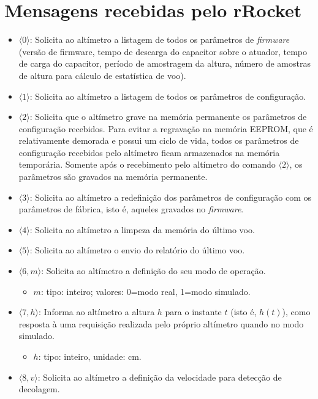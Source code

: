 \documentclass[portuguese,10pt,a4paper]{article}
\begin{document}
\section{Mensagens recebidas pelo rRocket}
\begin{itemize}
	\item $\langle 0\rangle$:
	Solicita ao altímetro a listagem de todos os parâmetros de \textit{firmware} (versão de firmware, tempo de descarga do capacitor sobre o atuador, tempo de carga do capacitor, período de amostragem da altura, número de amostras de altura para cálculo de estatística de voo).
	\item $\langle 1\rangle$:
	Solicita ao altímetro a listagem de todos os parâmetros de configuração.
	\item $\langle 2\rangle$:
	Solicita que o altímetro grave na memória permanente os parâmetros de configuração recebidos. Para evitar a regravação na memória EEPROM, que é relativamente demorada e possui um ciclo de vida, todos os parâmetros de configuração recebidos pelo altímetro ficam armazenados na memória temporária. Somente após o recebimento pelo altímetro do comando $\langle 2\rangle$, os parâmetros são gravados na memória permanente.
	\item $\langle 3\rangle$: 
	Solicita ao altímetro a redefinição dos parâmetros de configuração com os parâmetros de fábrica, isto é, aqueles gravados no \textit{firmware}.
	\item $\langle 4\rangle$:
	Solicita ao altímetro a limpeza da memória do último voo.
	\item $\langle 5\rangle$:
	Solicita ao altímetro o envio do relatório do último voo.
	\item $\langle 6, m\rangle$:
	Solicita ao altímetro a definição do seu modo de operação.
	\begin{itemize}
		\item $m$: tipo: inteiro; valores: 0=modo real, 1=modo simulado.
	\end{itemize}
	\item $\langle 7, h\rangle$:
	Informa ao altímetro a altura $h$ para o instante $t$ (isto é, $h(t)$), como resposta à uma requisição realizada pelo próprio altímetro quando no modo simulado.
	\begin{itemize}
		\item $h$: tipo: inteiro, unidade: cm.  
	\end{itemize}
	\item $\langle 8, v\rangle$:
	Solicita ao altímetro a definição da velocidade para detecção de decolagem.

\end{itemize}
\end{document}
